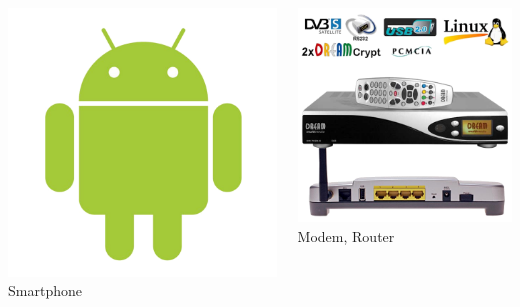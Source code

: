 \documentclass{beamer}
\begin{document}
\begin{frame}
\begin{columns}
    \begin{column}{.25\textwidth}
        \includegraphics[width=.9\linewidth]{img/android.png}
        \centering
        Smartphone
    \end{column}

    \begin{column}{.25\textwidth}
        \includegraphics[width=.9\linewidth]{img/router-decoder.png}
        \centering
        Modem, Router
    \end{column}
    \end{columns}

\end{frame}
\end{document}
